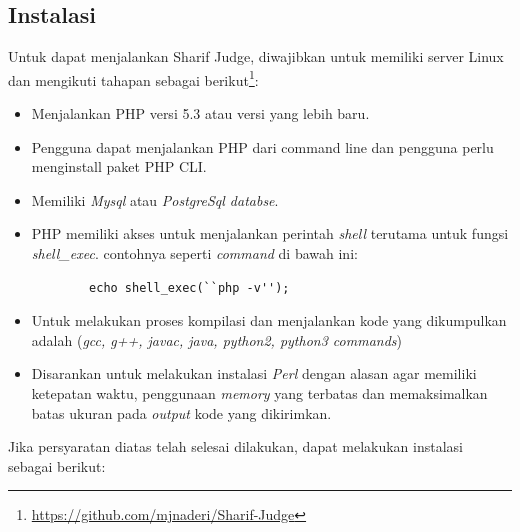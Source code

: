 \subsection{Instalasi}
\label{sec:Instalasi}
Untuk dapat menjalankan Sharif Judge, diwajibkan untuk memiliki server Linux dan mengikuti tahapan sebagai berikut\footnote{\url{https://github.com/mjnaderi/Sharif-Judge}\label{github}}:
\begin{itemize}
    \item Menjalankan PHP versi 5.3 atau versi yang lebih baru.
    \item Pengguna dapat menjalankan PHP dari command line  dan pengguna perlu menginstall paket PHP CLI.
    \item Memiliki \textit{Mysql} atau \textit{PostgreSql databse}.
    \item PHP memiliki akses untuk menjalankan perintah \textit{shell} terutama untuk fungsi \textit{shell\_exec}. contohnya seperti \textit{command} di bawah ini: 
    \vspace{-2mm}
    \begin{verbatim}
        echo shell_exec(``php -v'');
    \end{verbatim}
    \vspace{-5mm}
    \item Untuk melakukan proses kompilasi dan menjalankan kode yang dikumpulkan adalah (\textit{gcc, g++, javac, java, python2, python3 commands})
    \item Disarankan untuk melakukan instalasi \textit{Perl} dengan alasan agar memiliki ketepatan waktu, penggunaan \textit{memory} yang terbatas dan memaksimalkan batas ukuran pada \textit{output} kode yang dikirimkan.
\end{itemize}
Jika persyaratan diatas telah selesai dilakukan, dapat melakukan instalasi sebagai berikut: 
